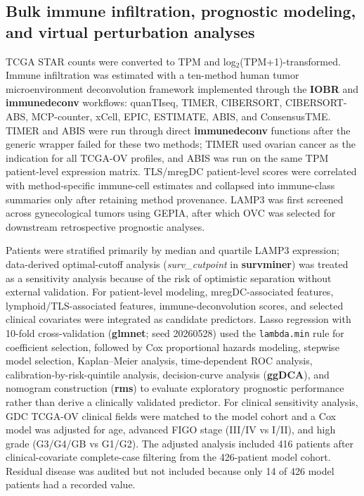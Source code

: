 \documentclass[cancers,article,submit,pdftex,moreauthors]{Definitions/mdpi}
\begin{document}
\subsection{Bulk immune infiltration, prognostic modeling, and virtual perturbation analyses}
TCGA STAR counts were converted to TPM and log$_2$(TPM+1)-transformed. Immune infiltration was estimated with a ten-method human tumor microenvironment deconvolution framework implemented through the \textbf{IOBR} and \textbf{immunedeconv} workflows: quanTIseq, TIMER, CIBERSORT, CIBERSORT-ABS, MCP-counter, xCell, EPIC, ESTIMATE, ABIS, and ConsensusTME\cite{bib56,bib57}. TIMER and ABIS were run through direct \textbf{immunedeconv} functions after the generic wrapper failed for these two methods; TIMER used ovarian cancer as the indication for all TCGA-OV profiles, and ABIS was run on the same TPM patient-level expression matrix. TLS/mregDC patient-level scores were correlated with method-specific immune-cell estimates and collapsed into immune-class summaries only after retaining method provenance. LAMP3 was first screened across gynecological tumors using GEPIA, after which OVC was selected for downstream retrospective prognostic analyses\cite{bib58}.

Patients were stratified primarily by median and quartile LAMP3 expression; data-derived optimal-cutoff analysis (\textit{surv\_cutpoint} in \textbf{survminer}) was treated as a sensitivity analysis because of the risk of optimistic separation without external validation. For patient-level modeling, mregDC-associated features, lymphoid/TLS-associated features, immune-deconvolution scores, and selected clinical covariates were integrated as candidate predictors. Lasso regression with 10-fold cross-validation (\textbf{glmnet}; seed 20260528) used the \texttt{lambda.min} rule for coefficient selection, followed by Cox proportional hazards modeling, stepwise model selection, Kaplan--Meier analysis, time-dependent ROC analysis, calibration-by-risk-quintile analysis, decision-curve analysis (\textbf{ggDCA}), and nomogram construction (\textbf{rms}) to evaluate exploratory prognostic performance rather than derive a clinically validated predictor\cite{bib59,bib61,bib62,bib63,bib64,bib112}. For clinical sensitivity analysis, GDC TCGA-OV clinical fields were matched to the model cohort and a Cox model was adjusted for age, advanced FIGO stage (III/IV vs I/II), and high grade (G3/G4/GB vs G1/G2). The adjusted analysis included 416 patients after clinical-covariate complete-case filtering from the 426-patient model cohort. Residual disease was audited but not included because only 14 of 426 model patients had a recorded value.
\end{document}
